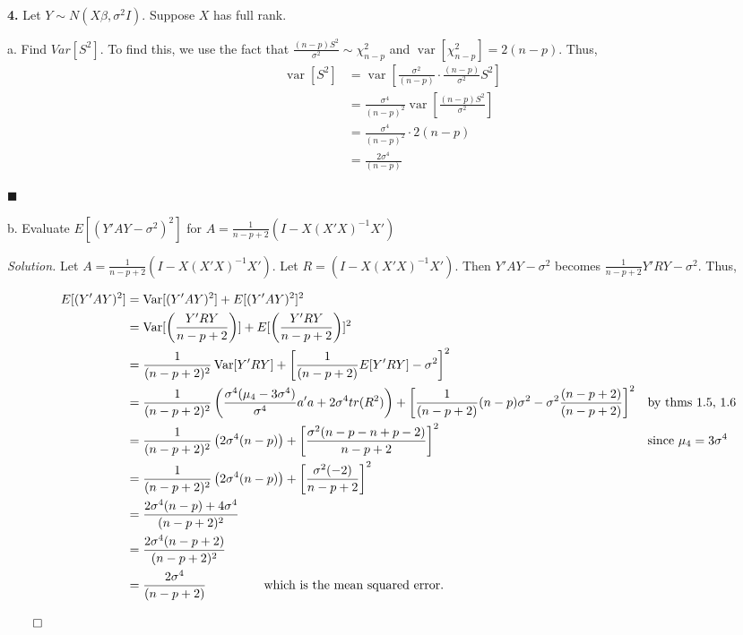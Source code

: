\documentclass{article}
\newcommand{\Var}{\operatorname{Var}} %
\newcommand{\var}{\operatorname{var}} %
\begin{document}
\newpage
\textbf{4.} Let \(Y \sim N(X\beta, \sigma^2I)\). Suppose \(X\) has full rank. 

\vspace{6mm}
a. Find \(Var[S^2]\). To find this, we use the fact that \(\frac{(n-p)S^2}{\sigma^2} \sim \chi_{n-p}^2 \) and \(\var[\chi_{n-p}^2] = 2(n-p)\). Thus, 
\begin{align*}
\var[S^2] &= \var[\frac{\sigma^2}{(n-p)}\cdot \frac{(n-p)}{\sigma^2} S^2]\\
&=\frac{\sigma^4}{(n-p)^2}\var[\frac{(n-p)S^2}{\sigma^2} ]\\
&= \frac{\sigma^4}{(n-p)^2}\cdot 2(n-p) \\
&=\frac{2\sigma^4}{(n-p)}
\end{align*}
  \begin{flushright}
\(\blacksquare\)
\end{flushright} 


\vspace{6mm}
b. Evaluate \(E[ (Y'AY-\sigma^2)^2] \) for \(A = \frac{1}{n-p+2}(I-X(X'X)^{-1}X') \)


\vspace{5mm}
\textit{Solution.} Let  \(A = \frac{1}{n-p+2}(I-X(X'X)^{-1}X') \). Let \(R= (I-X(X'X)^{-1}X') \). Then \(Y'AY-\sigma^2 \) becomes \(\frac1{n-p+2}Y'RY - \sigma^2\). Thus, 

\begin{align*}
&&  E[ (Y'AY)^2] &= \Var[(Y'AY)^2] + E[ (Y'AY)^2 ]^2 && \\
&& &= \Var[\left(\frac{Y'RY}{n-p+2}\right)] + E[ \left(\frac{Y'RY}{n-p+2}\right)]^2 && \\
&& &= \frac1{(n-p+2)^2} \Var[Y'RY] + \left[ \frac1{(n-p+2)}E[Y'RY] -\sigma^2 \right]^2 && \\
&&&=  \frac1{(n-p+2)^2}\left(\frac{\sigma^4(\mu_4 - 3\sigma^4)}{\sigma^4} a'a + 2\sigma^4 tr(R^2)\right) + \left[ \frac1{(n-p+2)}(n-p)\sigma^2 -\sigma^2 \frac{(n-p+2)}{(n-p+2)} \right]^2 &&\text{by thms 1.5, 1.6}\\
&&&= \frac1{(n-p+2)^2}\left(2\sigma^4(n-p) \right)+ \left[\frac{\sigma^2(n-p - n+p-2)}{n-p+2}  \right]^2&& \text{since } \mu_4 = 3\sigma^4 \\
&&&= \frac1{(n-p+2)^2}\left(2\sigma^4(n-p) \right)+ \left[\frac{\sigma^2(-2)}{n-p+2}  \right]^2\\
&&&= \frac{2\sigma^4(n-p) +4\sigma^4}{(n-p+2)^2} \\
&&&= \frac{2\sigma^4(n-p+2) }{(n-p+2)^2} \\
&&&= \frac{2\sigma^4}{(n-p+2)} \hspace{15mm} \text{ which is the mean squared error.} 
\end{align*}
  \begin{flushright}
\(\qed\)
\end{flushright} 
\end{document}
